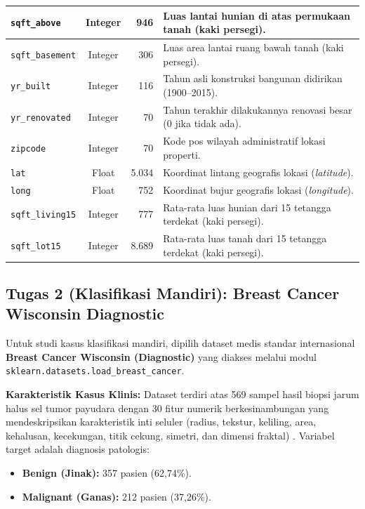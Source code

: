 \documentclass[a4paper,oneside,12pt]{report}
\begin{document}
\begin{table}[H]
\begin{tabularx}{\linewidth}{|l|c|r|>{\raggedright\arraybackslash}X|}
		\hline
		\texttt{sqft\_above}    & Integer            & 946           & Luas lantai hunian di atas permukaan tanah (kaki persegi).      \\
		\hline
		\texttt{sqft\_basement} & Integer            & 306           & Luas area lantai ruang bawah tanah (kaki persegi).              \\
		\hline
		\texttt{yr\_built}      & Integer            & 116           & Tahun asli konstruksi bangunan didirikan (1900--2015).          \\
		\hline
		\texttt{yr\_renovated}  & Integer            & 70            & Tahun terakhir dilakukannya renovasi besar (0 jika tidak ada).  \\
		\hline
		\texttt{zipcode}        & Integer            & 70            & Kode pos wilayah administratif lokasi properti.                 \\
		\hline
		\texttt{lat}            & Float              & 5.034         & Koordinat lintang geografis lokasi (\textit{latitude}).         \\
		\hline
		\texttt{long}           & Float              & 752           & Koordinat bujur geografis lokasi (\textit{longitude}).          \\
		\hline
		\texttt{sqft\_living15} & Integer            & 777           & Rata-rata luas hunian dari 15 tetangga terdekat (kaki persegi). \\
		\hline
		\texttt{sqft\_lot15}    & Integer            & 8.689         & Rata-rata luas tanah dari 15 tetangga terdekat (kaki persegi).  \\
		\hline
	\end{tabularx}
\end{table}

\clearpage

\subsection{Tugas 2 (Klasifikasi Mandiri): Breast Cancer Wisconsin Diagnostic}
Untuk studi kasus klasifikasi mandiri, dipilih dataset medis standar internasional \textbf{Breast Cancer Wisconsin (Diagnostic)} yang diakses melalui modul \texttt{sklearn.datasets.load\_breast\_cancer}.

\textbf{Karakteristik Kasus Klinis:} Dataset terdiri atas 569 sampel hasil biopsi jarum halus sel tumor payudara dengan 30 fitur numerik berkesinambungan yang mendeskripsikan karakteristik inti seluler (radius, tekstur, keliling, area, kehalusan, kecekungan, titik cekung, simetri, dan dimensi fraktal) \cite{street1993}. Variabel target adalah diagnosis patologis:
\begin{itemize}[noitemsep, topsep=1pt, parsep=0.5pt]
	\item \textbf{Benign (Jinak):} 357 pasien (62,74\%).
	\item \textbf{Malignant (Ganas):} 212 pasien (37,26\%).
\end{itemize}
\end{document}
